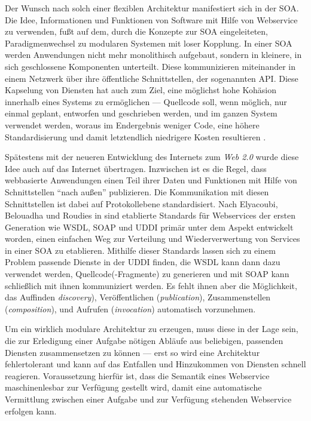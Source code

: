 \label{l:soa}Der Wunsch nach solch einer flexiblen Architektur manifestiert sich in der \ac{SOA}. Die Idee, Informationen und Funktionen von Software mit Hilfe von Webservice zu verwenden, fußt auf dem, durch die Konzepte zur \ac{SOA} eingeleiteten, Paradigmenwechsel zu modularen Systemen mit loser Kopplung. In einer \ac{SOA} werden Anwendungen nicht mehr monolithisch aufgebaut, sondern in kleinere, in sich geschlossene Komponenten unterteilt. Diese kommunizieren miteinander in einem Netzwerk über ihre öffentliche Schnittstellen, der sogenannten \ac{API}. Diese Kapselung von Diensten hat auch zum Ziel, eine möglichst hohe Kohäsion innerhalb eines Systems zu ermöglichen --- Quellcode soll, wenn möglich, nur einmal geplant, entworfen und geschrieben werden, und im ganzen System verwendet werden, woraus im Endergebnis weniger Code, eine höhere Standardisierung und damit letztendlich niedrigere Kosten resultieren \cite[S.62]{hn-web20}. 

Spätestens mit der neueren Entwicklung des Internets zum \emph{Web 2.0} wurde diese Idee auch auf das Internet übertragen. Inzwischen ist es die Regel, dass webbasierte Anwendungen einen Teil ihrer Daten und Funktionen mit Hilfe von Schnittstellen "`nach außen"' publizieren. Die Kommunikation mit diesen Schnittstellen ist dabei auf Protokollebene standardisiert. Nach Elyacoubi, Belouadha und Roudies in \cite[S.653]{ei-sawsdl} sind etablierte Standards für Webservices der ersten Generation wie \ac{WSDL}, \ac{SOAP} und \ac{UDDI} primär unter dem Aspekt entwickelt worden, einen einfachen Weg zur Verteilung und Wiederverwertung von Services in einer \ac{SOA} zu etablieren. Mithilfe dieser Standards lassen sich zu einem Problem passende Dienste in der \ac{UDDI} finden, die \ac{WSDL} kann dann dazu verwendet werden, Quellcode(-Fragmente) zu generieren und mit \ac{SOAP} kann schließlich mit ihnen kommuniziert werden. Es fehlt ihnen aber die Möglichkeit, das Auffinden \emph{discovery}), Veröffentlichen (\emph{publication}), Zusammenstellen (\emph{composition}), und Aufrufen (\emph{invocation}) automatisch vorzunehmen.

\label{l:intro-loosecoupling}Um ein wirklich modulare Architektur zu erzeugen, muss diese in der Lage sein, die zur Erledigung einer Aufgabe nötigen Abläufe aus beliebigen, passenden Diensten zusammensetzen zu können --- erst so wird eine Architektur fehlertolerant und kann auf das Entfallen und Hinzukommen von Diensten schnell reagieren. Voraussetzung hierfür ist, dass die Semantik eines Webservice maschinenlesbar zur Verfügung gestellt wird, damit eine automatische Vermittlung zwischen einer Aufgabe und zur Verfügung stehenden Webservice erfolgen kann.

